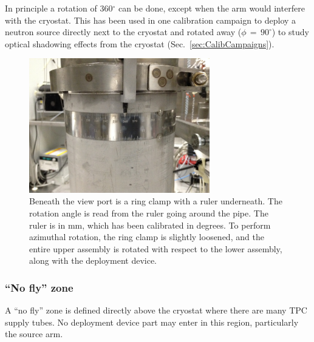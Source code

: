 In principle a rotation of 360$^\circ$ can be done, except when the arm would interfere with the cryostat. This has been used in one calibration campaign to deploy a neutron source directly next to the cryostat and rotated away ($\phi\,=\,90^\circ$) to study optical shadowing effects from the cryostat (Sec.~\ref{sec:CalibCampaigns}). 





\begin{figure}[htbp]
 \centering
  \includegraphics[width=0.7\textwidth]{Figures/RingClamp_WithPin_IMG_2669.JPG}
  \caption{Beneath the view port is a ring clamp with a ruler underneath. The rotation angle is read from the ruler going around the pipe. The ruler is in mm, which has been calibrated in degrees. To perform azimuthal rotation, the ring clamp is slightly loosened, and the entire upper assembly is rotated with respect to the lower assembly, along with the deployment device.}
  \label{fig:ring_clamp}
\end{figure} 

\subsubsection*{``No fly'' zone}
A ``no fly'' zone is defined directly above the cryostat where there are many TPC supply tubes. No deployment device part may enter in this region, particularly the source arm.

